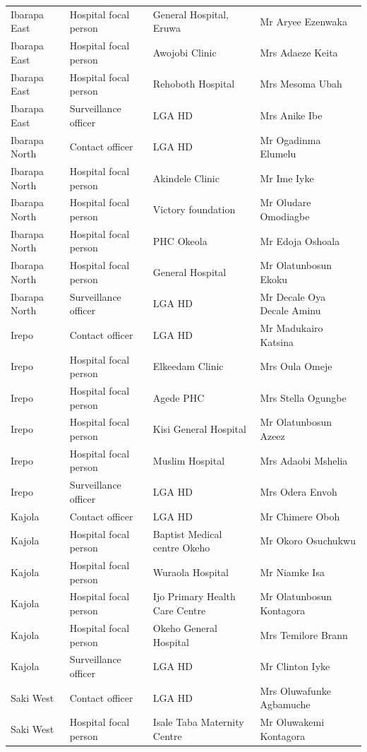 \documentclass[a4paper, titlepage]{tufte-handout}
\begin{document}
\begin{table}
\begin{tabular}{l|l|l|l}
Ibarapa East & Hospital focal person & General Hospital, Eruwa & Mr Aryee Ezenwaka\\
Ibarapa East & Hospital focal person & Awojobi Clinic & Mrs Adaeze Keita\\
Ibarapa East & Hospital focal person & Rehoboth Hospital & Mrs Mesoma Ubah\\
Ibarapa East & Surveillance officer & LGA HD & Mrs Anike Ibe\\
Ibarapa North & Contact officer & LGA HD & Mr Ogadinma Elumelu\\
Ibarapa North & Hospital focal person & Akindele Clinic & Mr Ime  Iyke\\
Ibarapa North & Hospital focal person & Victory foundation & Mr Oludare Omodiagbe\\
Ibarapa North & Hospital focal person & PHC Okeola & Mr Edoja Oshoala\\
Ibarapa North & Hospital focal person & General Hospital & Mr Olatunbosun Ekoku\\
Ibarapa North & Surveillance officer & LGA HD & Mr Decale Oya Decale Aminu\\
Irepo & Contact officer & LGA HD & Mr Madukairo Katsina\\
Irepo & Hospital focal person & Elkeedam Clinic & Mrs Oula Omeje\\
Irepo & Hospital focal person & Agede PHC & Mrs Stella Ogungbe\\
Irepo & Hospital focal person & Kisi General Hospital & Mr Olatunbosun Azeez\\
Irepo & Hospital focal person & Muslim Hospital & Mrs Adaobi Mshelia\\
Irepo & Surveillance officer & LGA HD & Mrs Odera Envoh\\
Kajola & Contact officer & LGA HD & Mr Chimere Oboh\\
Kajola & Hospital focal person & Baptist Medical centre Okeho & Mr Okoro Osuchukwu\\
Kajola & Hospital focal person & Wuraola Hospital & Mr Niamke Isa\\
Kajola & Hospital focal person & Ijo Primary Health Care Centre & Mr Olatunbosun Kontagora\\
Kajola & Hospital focal person & Okeho General Hospital & Mrs Temilore Brann\\
Kajola & Surveillance officer & LGA HD & Mr Clinton Iyke\\
Saki West & Contact officer & LGA HD & Mrs Oluwafunke Agbamuche\\
Saki West & Hospital focal person & Isale Taba Maternity Centre & Mr Oluwakemi Kontagora\\

\end{tabular}
\end{table}
\end{document}
